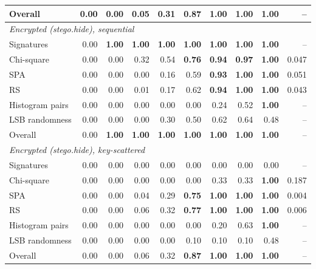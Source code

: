 \begin{table}[htbp]
\begin{tabular}{lrrrrrrrrr}
Overall & 0.00 & 0.00 & 0.05 & 0.31 & \textbf{0.87} & \textbf{1.00} & \textbf{1.00} & \textbf{1.00} & -- \\
\midrule
\multicolumn{10}{l}{\emph{Encrypted (stego.hide), sequential}} \\
Signatures & 0.00 & \textbf{1.00} & \textbf{1.00} & \textbf{1.00} & \textbf{1.00} & \textbf{1.00} & \textbf{1.00} & \textbf{1.00} & -- \\
Chi-square & 0.00 & 0.00 & 0.32 & 0.54 & \textbf{0.76} & \textbf{0.94} & \textbf{0.97} & \textbf{1.00} & 0.047 \\
SPA & 0.00 & 0.00 & 0.00 & 0.16 & 0.59 & \textbf{0.93} & \textbf{1.00} & \textbf{1.00} & 0.051 \\
RS & 0.00 & 0.00 & 0.01 & 0.17 & 0.62 & \textbf{0.94} & \textbf{1.00} & \textbf{1.00} & 0.043 \\
Histogram pairs & 0.00 & 0.00 & 0.00 & 0.00 & 0.00 & 0.24 & 0.52 & \textbf{1.00} & -- \\
LSB randomness & 0.00 & 0.00 & 0.00 & 0.30 & 0.50 & 0.62 & 0.64 & 0.48 & -- \\
Overall & 0.00 & \textbf{1.00} & \textbf{1.00} & \textbf{1.00} & \textbf{1.00} & \textbf{1.00} & \textbf{1.00} & \textbf{1.00} & -- \\
\midrule
\multicolumn{10}{l}{\emph{Encrypted (stego.hide), key-scattered}} \\
Signatures & 0.00 & 0.00 & 0.00 & 0.00 & 0.00 & 0.00 & 0.00 & 0.00 & -- \\
Chi-square & 0.00 & 0.00 & 0.00 & 0.00 & 0.00 & 0.33 & 0.33 & \textbf{1.00} & 0.187 \\
SPA & 0.00 & 0.00 & 0.04 & 0.29 & \textbf{0.75} & \textbf{1.00} & \textbf{1.00} & \textbf{1.00} & 0.004 \\
RS & 0.00 & 0.00 & 0.06 & 0.32 & \textbf{0.77} & \textbf{1.00} & \textbf{1.00} & \textbf{1.00} & 0.006 \\
Histogram pairs & 0.00 & 0.00 & 0.00 & 0.00 & 0.00 & 0.20 & 0.63 & \textbf{1.00} & -- \\
LSB randomness & 0.00 & 0.00 & 0.00 & 0.00 & 0.10 & 0.10 & 0.10 & 0.48 & -- \\
Overall & 0.00 & 0.00 & 0.06 & 0.32 & \textbf{0.87} & \textbf{1.00} & \textbf{1.00} & \textbf{1.00} & -- \\
\bottomrule
\end{tabular}
\end{table}
